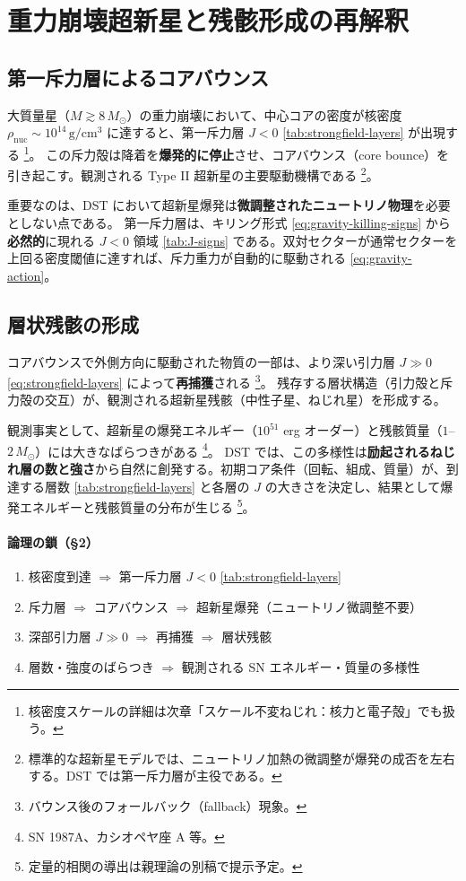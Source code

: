 \documentclass[dvipdfmx,a4paper,oneside]{jsbook}
\numberwithin{equation}{chapter}
\begin{document}
\section{重力崩壊超新星と残骸形成の再解釈}

\subsection{第一斥力層によるコアバウンス}

大質量星（\(M \gtrsim 8\,M_\odot\)）の重力崩壊において、中心コアの密度が核密度 \(\rho_{\mathrm{nuc}} \sim 10^{14}\,\mathrm{g/cm^3}\) に達すると、第一斥力層 \(J < 0\) \eqref{tab:strongfield-layers} が出現する \footnote{核密度スケールの詳細は次章「スケール不変ねじれ：核力と電子殻」でも扱う。}。
この斥力殻は降着を\textbf{爆発的に停止}させ、コアバウンス（core bounce）を引き起こす。観測される Type II 超新星の主要駆動機構である \footnote{標準的な超新星モデルでは、ニュートリノ加熱の微調整が爆発の成否を左右する。DST では第一斥力層が主役である。}。

重要なのは、DST において超新星爆発は\textbf{微調整されたニュートリノ物理}を必要としない点である。
第一斥力層は、キリング形式 \eqref{eq:gravity-killing-signs} から\textbf{必然的}に現れる \(J < 0\) 領域 \eqref{tab:J-signs} である。双対セクターが通常セクターを上回る密度閾値に達すれば、斥力重力が自動的に駆動される \eqref{eq:gravity-action}。

\subsection{層状残骸の形成}

コアバウンスで外側方向に駆動された物質の一部は、より深い引力層 \(J \gg 0\) \eqref{eq:strongfield-layers} によって\textbf{再捕獲}される \footnote{バウンス後のフォールバック（fallback）現象。}。
残存する層状構造（引力殻と斥力殻の交互）が、観測される超新星残骸（中性子星、ねじれ星）を形成する。

観測事実として、超新星の爆発エネルギー（\(10^{51}\) erg オーダー）と残骸質量（\(1\)–\(2\,M_\odot\)）には大きなばらつきがある \footnote{SN 1987A、カシオペヤ座 A 等。}。
DST では、この多様性は\textbf{励起されるねじれ層の数と強さ}から自然に創発する。初期コア条件（回転、組成、質量）が、到達する層数 \eqref{tab:strongfield-layers} と各層の \(J\) の大きさを決定し、結果として爆発エネルギーと残骸質量の分布が生じる \footnote{定量的相関の導出は親理論の別稿で提示予定。}。

\paragraph{論理の鎖（§2）}
\begin{enumerate}[leftmargin=2em]
  \item 核密度到達 \(\Rightarrow\) 第一斥力層 \(J < 0\) \eqref{tab:strongfield-layers}
  \item 斥力層 \(\Rightarrow\) コアバウンス \(\Rightarrow\) 超新星爆発（ニュートリノ微調整不要）
  \item 深部引力層 \(J \gg 0\) \(\Rightarrow\) 再捕獲 \(\Rightarrow\) 層状残骸
  \item 層数・強度のばらつき \(\Rightarrow\) 観測される SN エネルギー・質量の多様性
\end{enumerate}
\end{document}
